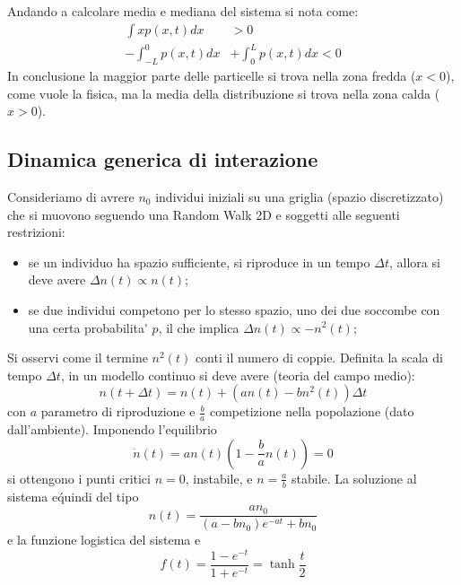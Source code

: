 \documentclass[12pt, a4paper]{book}
\theoremstyle{theorem}
\begin{document}
			Andando a calcolare media e mediana del sistema si nota come:
			\begin{equation*}
				\begin{split}
					\int xp(x,t)dx&>0\\
					-\int_{-L}^0p(x,t)dx&+\int_0^Lp(x,t)dx<0
				\end{split}
			\end{equation*}
			In conclusione la maggior parte delle particelle si trova nella zona fredda ($x<0$), come vuole la fisica, ma la media della distribuzione si trova nella zona calda ($x>0$).
			\subsection{Dinamica generica di interazione}
				Consideriamo di avrere $n_{0}$ individui iniziali su una griglia (spazio discretizzato) che si muovono seguendo una Random Walk 2D e soggetti alle seguenti restrizioni:
				\begin{itemize}
					\item se un individuo ha spazio sufficiente, si riproduce in un tempo $\Delta t$, allora si deve avere $\Delta n(t)\propto n(t)$;
					\item se due individui competono per lo stesso spazio, uno dei due soccombe con una certa probabilita\' $p$, il che implica $\Delta n(t)\propto -n^{2}(t)$;
				\end{itemize}
				Si osservi come il termine $n^{2}(t)$ conti il numero di coppie.
				Definita la scala di tempo $\Delta t$, in un modello continuo si deve avere (teoria del campo medio):
				\begin{equation*}
					n(t+\Delta t)=n(t)+\left(an(t)-bn^{2}(t)\right)\Delta t
				\end{equation*}
				con $a$ parametro di riproduzione e $\frac{b}{a}$ competizione nella popolazione (dato dall'ambiente).
				Imponendo l'equilibrio
				\begin{equation*}
					\dot{n}(t)=an(t)\left(1-\frac{b}{a}n(t)\right)=0
				\end{equation*}
				si ottengono i punti critici $n=0$, instabile, e $n=\frac{a}{b}$ stabile.
				La soluzione al sistema e\' quindi del tipo
				\begin{equation}
					n(t)=\frac{an_{0}}{\left(a-bn_{0}\right)e^{-at}+bn_{0}}
				\end{equation}
				e la funzione logistica del sistema e\'
				\begin{equation}
					f(t)=\frac{1-e^{-t}}{1+e^{-t}}=\tanh\frac{t}{2}
				\end{equation}
\end{document}
